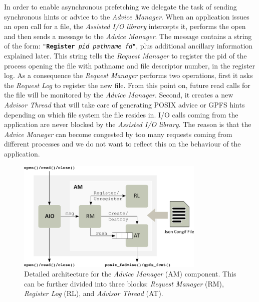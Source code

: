 In order to enable asynchronous prefetching we delegate the task of sending synchronous hints or advice to the \textit{Advice Manager}. When an application issues an open call for a file, the \textit{Assisted I/O library} intercepts it, performs the open and 
then sends a message to the \textit{Advice Manager}. The message contains a string of the form: \texttt{"\textbf{Register} \textit{pid} \textit{pathname} \textit{fd}"}, plus additional ancillary information explained later. This string tells the \textit{Request 
Manager} to register the pid of the process opening the file with pathname and file descriptor number, in the register log. As a consequence the \textit{Request Manager} performs two operations, first it asks the \textit{Request Log} to register the new file. 
From this point on, future read calls for the file will be monitored by the \textit{Advice Manager}. Second, it creates a new \textit{Advisor Thread} that will take care of generating POSIX advice or GPFS hints depending on which file system the file resides 
in. I/O calls coming from the application are never blocked by the \textit{Assisted I/O library}. The reason is that the \textit{Advice Manager} can become congested by too many requests coming from different processes and we do not want to reflect this on the 
behaviour of the application.  %

\begin{figure}[!htb]
  \centering
  \includegraphics[width=0.8\textwidth]{chapters/chapter2/figures/mercury-architecture}
  \caption{Detailed architecture for the \textit{Advice Manager} (AM) component. This can be further divided into three blocks: \textit{Request Manager} (RM), \textit{Register Log} (RL), and \textit{Advisor Thread} (AT).}
  \label{figure: architecture}
\end{figure}

